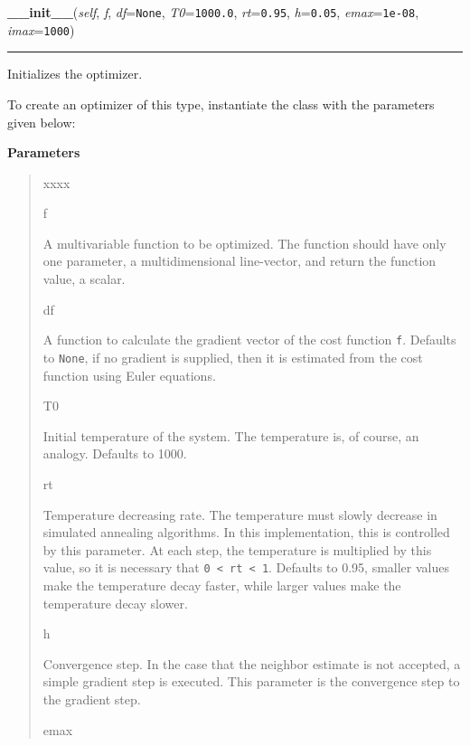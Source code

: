     \begin{boxedminipage}{\textwidth}

    \raggedright \textbf{\_\_init\_\_}(\textit{self}, \textit{f}, \textit{df}=\texttt{None}, \textit{T0}=\texttt{1000.0}, \textit{rt}=\texttt{0.95}, \textit{h}=\texttt{0.05}, \textit{emax}=\texttt{1e-08}, \textit{imax}=\texttt{1000})

    \vspace{-1.5ex}

    \rule{\textwidth}{0.5\fboxrule}

Initializes the optimizer.

To create an optimizer of this type, instantiate the class with the
parameters given below:
    \vspace{1ex}

      \textbf{Parameters}
      \begin{quote}
        \begin{Ventry}{xxxx}

          \item[f]


A multivariable function to be optimized. The function should have
only one parameter, a multidimensional line-vector, and return the
function value, a scalar.
          \item[df]


A function to calculate the gradient vector of the cost function
\texttt{f}. Defaults to \texttt{None}, if no gradient is supplied, then it is
estimated from the cost function using Euler equations.
          \item[T0]


Initial temperature of the system. The temperature is, of course, an
analogy. Defaults to 1000.
          \item[rt]


Temperature decreasing rate. The temperature must slowly decrease in
simulated annealing algorithms. In this implementation, this is
controlled by this parameter. At each step, the temperature is
multiplied by this value, so it is necessary that \texttt{0 < rt < 1}.
Defaults to 0.95, smaller values make the temperature decay faster,
while larger values make the temperature decay slower.
          \item[h]


Convergence step. In the case that the neighbor estimate is not
accepted, a simple gradient step is executed. This parameter is the
convergence step to the gradient step.
          \item[emax]



\end{Ventry}
\end{quote}
\end{boxedminipage}
